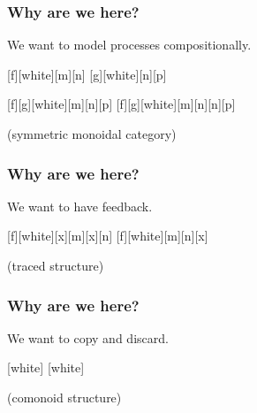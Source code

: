 \begin{frame}
    \frametitle{Why are we here?}

    \centering

    \LARGE
    We want to model processes \alert{compositionally}.

    \pause
    \normalsize
    \vspace{2em}

    [f][white][m][n]
    [g][white][n][p]

    \pause
    \vspace{2em}

    [f][g][white][m][n][p]
    [f][g][white][m][n][n][p]

    \normalsize
    \vspace{1em}

    (\alert{symmetric monoidal category})

\end{frame}

\begin{frame}
    \frametitle{Why are we here?}

    \centering
    \LARGE
    We want to have \alert{feedback}.

    \pause
    \normalsize
    \vspace{2em}

    [f][white][x][m][x][n]
    \quad
    \pause
    \scalebox{2}{\(\Rightarrow\)}
    \quad
    [f][white][m][n][x]

    \pause
    \vspace{1em}
    (traced structure)

\end{frame}

\begin{frame}
    \frametitle{Why are we here?}

    \centering

    \LARGE
    We want to \alert{copy} and \alert{discard}.

    \pause

    \normalsize
    \vspace{2em}

    [white]
    [white]

    \pause
    \vspace{1em}
    (comonoid structure)

\end{frame}

